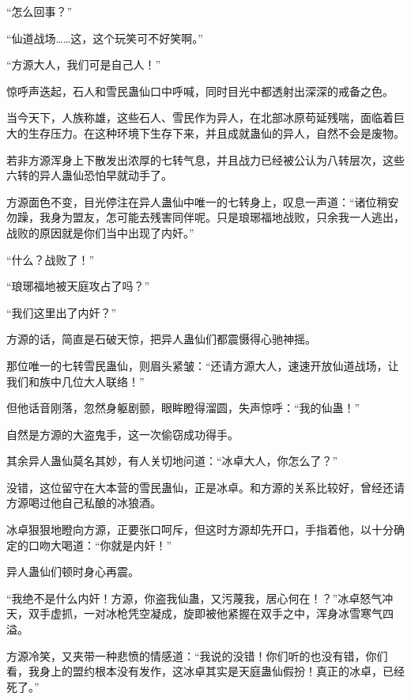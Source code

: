 
\begin{this_body}



“怎么回事？”

“仙道战场……这，这个玩笑可不好笑啊。”

“方源大人，我们可是自己人！”

惊呼声迭起，石人和雪民蛊仙口中呼喊，同时目光中都透射出深深的戒备之色。

当今天下，人族称雄，这些石人、雪民作为异人，在北部冰原苟延残喘，面临着巨大的生存压力。在这种环境下生存下来，并且成就蛊仙的异人，自然不会是废物。

若非方源浑身上下散发出浓厚的七转气息，并且战力已经被公认为八转层次，这些六转的异人蛊仙恐怕早就动手了。

方源面色不变，目光停注在异人蛊仙中唯一的七转身上，叹息一声道：“诸位稍安勿躁，我身为盟友，怎可能去残害同伴呢。只是琅琊福地战败，只余我一人逃出，战败的原因就是你们当中出现了内奸。”

“什么？战败了！”

“琅琊福地被天庭攻占了吗？”

“我们这里出了内奸？”

方源的话，简直是石破天惊，把异人蛊仙们都震慑得心驰神摇。

那位唯一的七转雪民蛊仙，则眉头紧皱：“还请方源大人，速速开放仙道战场，让我们和族中几位大人联络！”

但他话音刚落，忽然身躯剧颤，眼眸瞪得溜圆，失声惊呼：“我的仙蛊！”

自然是方源的大盗鬼手，这一次偷窃成功得手。

其余异人蛊仙莫名其妙，有人关切地问道：“冰卓大人，你怎么了？”

没错，这位留守在大本营的雪民蛊仙，正是冰卓。和方源的关系比较好，曾经还请方源喝过他自己私酿的冰狼酒。

冰卓狠狠地瞪向方源，正要张口呵斥，但这时方源却先开口，手指着他，以十分确定的口吻大喝道：“你就是内奸！”

异人蛊仙们顿时身心再震。

“我绝不是什么内奸！方源，你盗我仙蛊，又污蔑我，居心何在！？”冰卓怒气冲天，双手虚抓，一对冰枪凭空凝成，旋即被他紧握在双手之中，浑身冰雪寒气四溢。

方源冷笑，又夹带一种悲愤的情感道：“我说的没错！你们听的也没有错，你们看，我身上的盟约根本没有发作，这冰卓其实是天庭蛊仙假扮！真正的冰卓，已经死了。”


\end{this_body}
